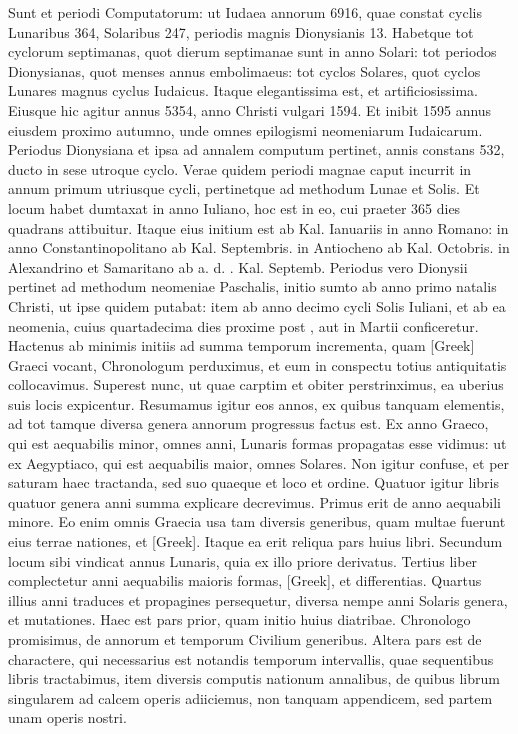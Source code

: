 Sunt et periodi Computatorum: ut Iudaea
annorum 6916, quae constat cyclis Lunaribus 364, Solaribus 247, periodis
magnis Dionysianis 13.
Habetque tot cyclorum septimanas,
quot dierum septimanae sunt in anno Solari: tot periodos Dionysianas,
quot menses annus embolimaeus: tot cyclos Solares, quot cyclos
Lunares magnus cyclus Iudaicus.
Itaque elegantissima est, et artificiosissima.
Eiusque hic agitur annus 5354, anno Christi vulgari 1594.
Et inibit 1595 annus eiusdem proximo autumno, unde omnes epilogismi
neomeniarum Iudaicarum.
Periodus Dionysiana et ipsa ad
annalem computum pertinet, annis constans 532, ducto in sese utroque
cyclo.
Verae quidem periodi magnae caput incurrit in annum
primum utriusque cycli, pertinetque ad methodum Lunae et Solis.
Et
locum habet dumtaxat in anno Iuliano, hoc est in eo, cui praeter 365
dies quadrans attibuitur.
Itaque eius initium est ab Kal. Ianuariis in
anno Romano: in anno Constantinopolitano ab Kal. Septembris. in
Antiocheno ab Kal. Octobris. in Alexandrino et Samaritano ab a. d.
. Kal. Septemb.
Periodus vero Dionysii pertinet ad methodum
neomeniae Paschalis, initio sumto ab anno primo natalis Christi, ut
ipse quidem putabat: item ab anno decimo cycli Solis Iuliani, et ab
ea neomenia, cuius quartadecima dies proxime post
 , aut in 
Martii conficeretur.
Hactenus ab minimis initiis ad summa temporum
incrementa, quam \textgreek{[Greek]} Graeci vocant, Chronologum
perduximus, et eum in conspectu totius antiquitatis collocavimus.
Superest nunc, ut quae carptim et obiter perstrinximus, ea uberius
suis locis expicentur.
Resumamus igitur eos annos, ex quibus tanquam
elementis, ad tot tamque diversa genera annorum progressus
factus est.
Ex anno Graeco, qui est aequabilis minor, omnes anni, Lunaris
formas propagatas esse vidimus: ut ex Aegyptiaco, qui est aequabilis
maior, omnes Solares.
Non igitur confuse, et per saturam haec
tractanda, sed suo quaeque et loco et ordine.
Quatuor igitur libris
quatuor genera anni summa explicare decrevimus.
Primus erit de
anno aequabili minore.
Eo enim omnis Graecia usa tam diversis generibus,
quam multae fuerunt eius terrae nationes, et \textgreek{[Greek]}.
Itaque
ea erit reliqua pars huius libri.
Secundum locum sibi vindicat annus
Lunaris, quia ex illo priore derivatus.
Tertius liber complectetur anni
aequabilis maioris formas, \textgreek{[Greek]}, et differentias.
Quartus illius anni
traduces et propagines persequetur, diversa nempe anni Solaris genera,
et mutationes.
Haec est pars prior, quam initio huius diatribae.
Chronologo promisimus, de annorum et temporum Civilium generibus.
Altera pars est de charactere, qui necessarius est notandis temporum
intervallis, quae sequentibus libris tractabimus, item diversis
computis nationum annalibus, de quibus librum singularem ad calcem
operis adiiciemus, non tanquam appendicem, sed partem unam
operis nostri.

